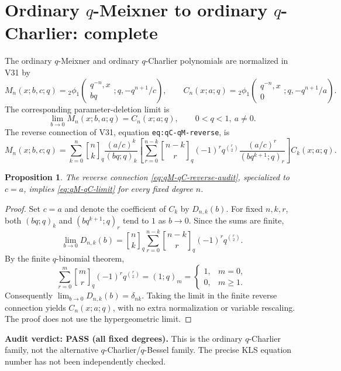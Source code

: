 \documentclass[11pt]{article}
\newtheorem{proposition}{Proposition}
\begin{document}
\section{Ordinary $q$-Meixner to ordinary $q$-Charlier: complete}
The ordinary $q$-Meixner and ordinary $q$-Charlier polynomials are normalized in V31 by
\[
M_n(x;b,c;q)={}_2\phi_1\!\left(\begin{matrix}q^{-n},x\\bq\end{matrix};q,-q^{n+1}/c\right),\qquad
C_n(x;a;q)={}_2\phi_1\!\left(\begin{matrix}q^{-n},x\\0\end{matrix};q,-q^{n+1}/a\right).
\]
The corresponding parameter-deletion limit is
\begin{equation}\label{eq:qM-qC-limit}
\lim_{b\to0}M_n(x;b,a;q)=C_n(x;a;q),\qquad 0<q<1,\ a\ne0.
\end{equation}
The reverse connection of V31, equation \texttt{eq:qC-qM-reverse}, is
\begin{equation}\label{eq:qM-qC-reverse-audit}
M_n(x;b,c;q)=\sum_{k=0}^n {n\brack k}_q\frac{(a/c)^k}{(bq;q)_k}
\left[\sum_{r=0}^{n-k}{n-k\brack r}_q(-1)^rq^{\binom r2}
\frac{(a/c)^r}{(bq^{k+1};q)_r}\right]C_k(x;a;q).
\end{equation}
\begin{proposition}
The reverse connection \eqref{eq:qM-qC-reverse-audit}, specialized to $c=a$, implies \eqref{eq:qM-qC-limit} for every fixed degree $n$.
\end{proposition}
\begin{proof}
Set $c=a$ and denote the coefficient of $C_k$ by $D_{n,k}(b)$. For fixed $n,k,r$, both $(bq;q)_k$ and $(bq^{k+1};q)_r$ tend to $1$ as $b\to0$. Since the sums are finite,
\[
\lim_{b\to0}D_{n,k}(b)
={n\brack k}_q\sum_{r=0}^{n-k}{n-k\brack r}_q(-1)^rq^{\binom r2}.
\]
By the finite $q$-binomial theorem,
\[
\sum_{r=0}^{m}{m\brack r}_q(-1)^rq^{\binom r2}=(1;q)_m
=\begin{cases}1,&m=0,\\0,&m\ge1.\end{cases}
\]
Consequently $\lim_{b\to0}D_{n,k}(b)=\delta_{nk}$. Taking the limit in the finite reverse connection yields $C_n(x;a;q)$, with no extra normalization or variable rescaling. The proof does not use the hypergeometric limit.
\end{proof}
\noindent\textbf{Audit verdict: PASS (all fixed degrees).} This is the ordinary $q$-Charlier family, not the alternative $q$-Charlier/$q$-Bessel family. The precise KLS equation number has not been independently checked.
\end{document}
